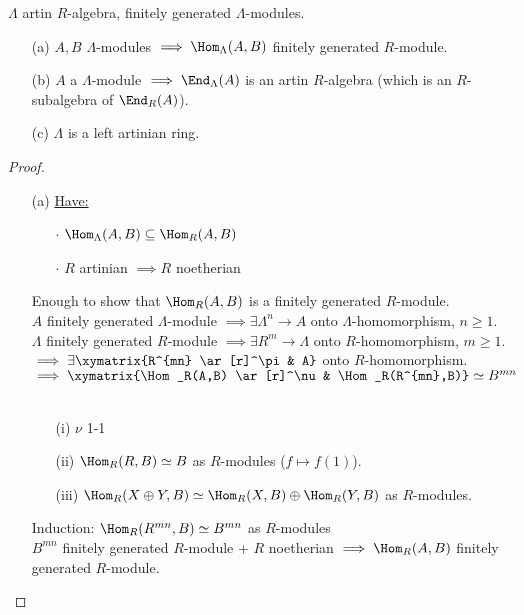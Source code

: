 \begin{prop}
$\Lambda$ artin $R$-algebra, finitely generated $\Lambda$-modules.
\begin{enumerate}
\item[(a)] $A,B$ $\Lambda$-modules $\implies  \Hom_\Lambda(A,B)$ finitely generated $R$-module.

\item[(b)] $A$ a $\Lambda$-module $\implies \End_\Lambda(A)$ is an artin $R$-algebra (which is an $R$-subalgebra of $\End_R(A)$).

\item[(c)] $\Lambda$ is a left artinian ring.
\end{enumerate}

\begin{proof}
\begin{enumerate}
\item[(a)] \underline{Have:} \begin{enumerate}
\item[$\cdot$] $\Hom_\Lambda(A,B) \subseteq \Hom_R(A,B)$
\item[$\cdot$] $R$ artinian $\implies R$ noetherian
\end{enumerate}
Enough to show that $\Hom_R(A,B)$ is a finitely generated $R$-module.\\
$A$ finitely generated $\Lambda$-module $\implies \exists \Lambda^n \to A$ onto $\Lambda$-homomorphism, $n \geq 1$.\\
$\Lambda$ finitely generated $R$-module $\implies \exists R^m \to \Lambda$ onto $R$-homomorphism, $m \geq 1$.\\
$\implies \exists \xymatrix{R^{mn} \ar[r]^\pi & A}$ onto $R$-homomorphism.\\
$\implies \xymatrix{\Hom_R(A,B) \ar[r]^\nu & \Hom_R(R^{mn},B)} \simeq B^{mn}$\\
\\
\begin{exer}
\begin{enumerate}
\item[(i)] $\nu$ 1-1
\item[(ii)] $\Hom_R(R,B) \simeq B$ as $R$-modules ($f \mapsto f(1)$).
\item[(iii)] $\Hom_R(X \oplus Y, B) \simeq \Hom_R(X,B) \oplus \Hom_R(Y,B)$ as $R$-modules.
\end{enumerate}
\end{exer}

Induction: $\Hom_R(R^{mn},B) \simeq B^{mn}$ as $R$-modules\\
$B^{mn}$ finitely generated $R$-module + $R$ noetherian $\implies \Hom_R(A,B)$ finitely generated $R$-module.


\end{enumerate}
\end{proof}
\end{prop}
